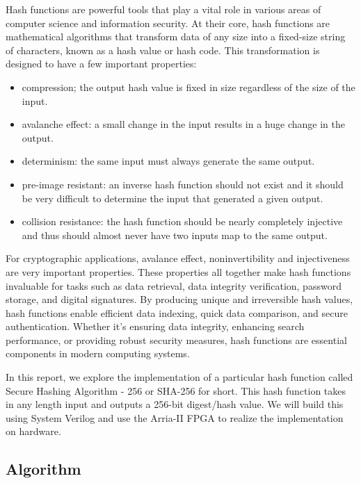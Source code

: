 \documentclass{article}
\begin{document}
Hash functions are powerful tools that play a vital role in various areas of computer science and information security. At their core, hash functions are mathematical algorithms that transform data of any size into a fixed-size string of characters, known as a hash value or hash code. This transformation is designed to have a few important properties:
\begin{itemize} %
  \item compression; the output hash value is fixed in size regardless of the size of the input.
  \item avalanche effect: a small change in the input results in a huge change in the output.
  \item determinism: the same input must always generate the same output.
  \item pre-image resistant: an inverse hash function should not exist and it should be very difficult to determine the input that generated a given output.
  \item collision resistance: the hash function should be nearly completely injective and thus should almost never have two inputs map to the same output.
\end{itemize}
For cryptographic applications, avalance effect, noninvertibility and injectiveness are very important properties. These properties all together make hash functions invaluable for tasks such as data retrieval, data integrity verification, password storage, and digital signatures. By producing unique and irreversible hash values, hash functions enable efficient data indexing, quick data comparison, and secure authentication. Whether it's ensuring data integrity, enhancing search performance, or providing robust security measures, hash functions are essential components in modern computing systems.

In this report, we explore the implementation of a particular hash function called Secure Hashing Algorithm - 256 or SHA-256 for short. This hash function takes in any length input and outputs a 256-bit digest/hash value. We will build this using System Verilog and use the Arria-II FPGA to realize the implementation on hardware.

\subsection{Algorithm}
\end{document}
